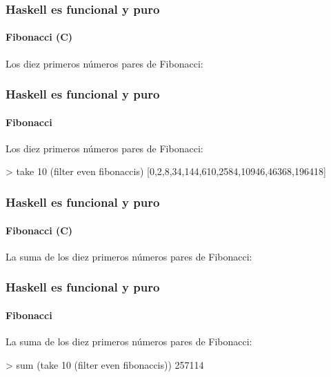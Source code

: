 \documentclass[spanish]{beamer}
\begin{document}

\begin{frame}[fragile]
  \frametitle{Haskell es funcional y puro}
  \framesubtitle{Fibonacci (C)}

  Los diez primeros números pares de Fibonacci:
\end{frame}


\begin{frame}[fragile]
  \frametitle{Haskell es funcional y puro}
  \framesubtitle{Fibonacci}

  Los diez primeros números pares de Fibonacci:
  \begin{code}
> take 10 (filter even fibonaccis)
[0,2,8,34,144,610,2584,10946,46368,196418]
  \end{code}
\end{frame}


\begin{frame}[fragile]
  \frametitle{Haskell es funcional y puro}
  \framesubtitle{Fibonacci (C)}

  La suma de los diez primeros números pares de Fibonacci:
\end{frame}


\begin{frame}[fragile]
  \frametitle{Haskell es funcional y puro}
  \framesubtitle{Fibonacci}

  La suma de los diez primeros números pares de Fibonacci:
  \begin{code}
> sum (take 10 (filter even fibonaccis))
257114
  \end{code}
\end{frame}

\end{document}
